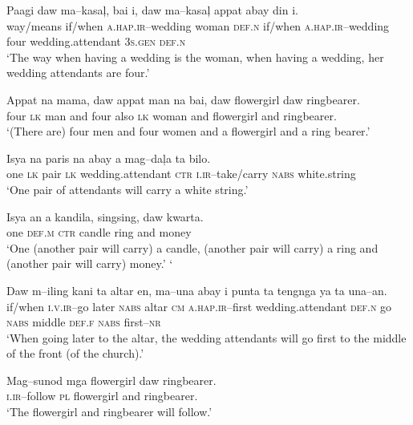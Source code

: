 \largerpage
\ea
\gll  Paagi  daw  ma--kasa\c{l},  bai  i, daw ma--kasa\c{l}  appat  abay  din  i. \\
way/means  if/when  \textsc{a.hap.ir}--wedding  woman  \textsc{def.n} if/when \textsc{a.hap.ir}--wedding  four  wedding.attendant  3\textsc{s.gen}  \textsc{def.n} \\
\glt  `The way when having a wedding is the woman, when having a wedding, her wedding attendants are four.’
\z

\ea
Appat  na  mama,  daw  appat  man  na  bai,  daw  flowergirl   daw  ringbearer.  \\
four  \textsc{lk}  man  and  four  also  \textsc{lk}  woman  and  flowergirl
and  ringbearer. \\
\glt  `(There are) four men and four women and a flowergirl and a ring bearer.’
\z

\ea
\gll  Isya  na  paris  na  abay  a  mag--da\c{l}a  ta  bilo.\footnotemark{} \\
one  \textsc{lk}  pair  \textsc{lk}  wedding.attendant  \textsc{ctr}  \textsc{i.ir}--take/carry  \textsc{nabs}  white.string \\
\glt  `One pair of attendants will carry a white string.’
\z

\ea
\gll  Isya  an  a  kandila,  singsing,  daw  kwarta. \\
one  \textsc{def.m}  \textsc{ctr}  candle  ring  and  money \\
\glt  `One (another pair will carry) a candle, (another pair will carry) a ring and (another pair will carry) money.' `
\z

\ea
\gll  Daw  m--iling  kani  ta  altar  en,  ma--una  abay  i   punta  ta  tengnga  ya  ta  una--an. \\
if/when  \textsc{i.v.ir}--go  later  \textsc{nabs}  altar  \textsc{cm}  \textsc{a.hap.ir}--first  wedding.attendant  \textsc{def.n}
go  \textsc{nabs}  middle  \textsc{def.f}  \textsc{nabs}  first--\textsc{nr} \\
\glt  `When going later to the altar, the wedding attendants will go first to the middle of the front (of the church).’
\z

\ea
\gll  Mag--sunod  mga  flowergirl  daw  ringbearer. \\
\textsc{i.ir}--follow  \textsc{pl}  flowergirl  and  ringbearer. \\
\glt `The flowergirl and ringbearer will follow.’
\z

